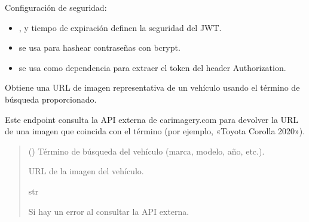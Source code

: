 \documentclass[letterpaper,10pt,spanish]{sphinxmanual}
\begin{document}

\begin{fulllineitems}
\label{\detokenize{endpoints:main.fm}}
\pysigstartsignatures
\pysigline
{}
\pysigstopsignatures
\sphinxAtStartPar
Configuración de seguridad:
\begin{itemize}
\item {} 
\sphinxAtStartPar
{},  y tiempo de expiración definen la seguridad del JWT.

\item {} 
\sphinxAtStartPar
{} se usa para hashear contraseñas con bcrypt.

\item {} 
\sphinxAtStartPar
{} se usa como dependencia para extraer el token del header Authorization.

\end{itemize}

\end{fulllineitems}


\begin{fulllineitems}
\label{\detokenize{endpoints:main.get_car_image}}
\pysigstartsignatures
\pysiglinewithargsret
{}
{}
{}
\pysigstopsignatures
\sphinxAtStartPar
Obtiene una URL de imagen representativa de un vehículo usando el término de búsqueda proporcionado.

\sphinxAtStartPar
Este endpoint consulta la API externa de carimagery.com para devolver la URL de una imagen que coincida con el término (por ejemplo, «Toyota Corolla 2020»).
\begin{quote}\begin{description}
\sphinxAtStartPar
{} () \textendash{} Término de búsqueda del vehículo (marca, modelo, año, etc.).

\sphinxAtStartPar
URL de la imagen del vehículo.

\sphinxAtStartPar
str

\sphinxAtStartPar
{} \textendash{} Si hay un error al consultar la API externa.

\end{description}\end{quote}

\end{fulllineitems}
\end{document}
